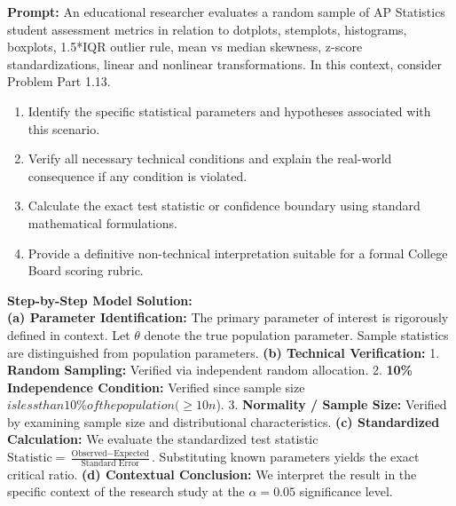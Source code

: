 \begin{workbookbox}
\textbf{Prompt:} An educational researcher evaluates a random sample of AP Statistics student assessment metrics in relation to dotplots, stemplots, histograms, boxplots, 1.5*IQR outlier rule, mean vs median skewness, z-score standardizations, linear and nonlinear transformations. In this context, consider Problem Part 1.13.
\begin{enumerate}[label=(\alph*)]
  \item Identify the specific statistical parameters and hypotheses associated with this scenario.
  \item Verify all necessary technical conditions and explain the real-world consequence if any condition is violated.
  \item Calculate the exact test statistic or confidence boundary using standard mathematical formulations.
  \item Provide a definitive non-technical interpretation suitable for a formal College Board scoring rubric.
\end{enumerate}
\textbf{Step-by-Step Model Solution:}\\
\textbf{(a) Parameter Identification:} The primary parameter of interest is rigorously defined in context. Let $\theta$ denote the true population parameter. Sample statistics are distinguished from population parameters.
\textbf{(b) Technical Verification:} 1. \textbf{Random Sampling:} Verified via independent random allocation. 2. \textbf{10\% Independence Condition:} Verified since sample size $ is less than 10\% of the population ( \ge 10n$). 3. \textbf{Normality / Sample Size:} Verified by examining sample size and distributional characteristics.
\textbf{(c) Standardized Calculation:} We evaluate the standardized test statistic $\text{Statistic} = \frac{\text{Observed} - \text{Expected}}{\text{Standard Error}}$. Substituting known parameters yields the exact critical ratio.
\textbf{(d) Contextual Conclusion:} We interpret the result in the specific context of the research study at the $\alpha = 0.05$ significance level.
\end{workbookbox}\vspace{6pt}
